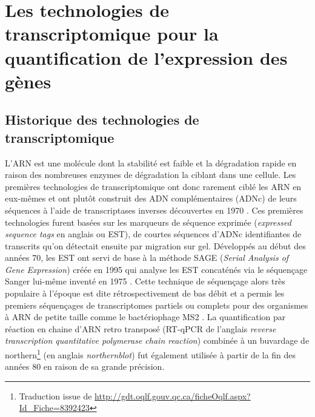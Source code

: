 \section{Les technologies de transcriptomique pour la quantification de l'expression des gènes}

\subsection{Historique des technologies de transcriptomique}

L'ARN est une molécule dont la stabilité est faible et la dégradation rapide en raison des nombreuses enzymes de dégradation la ciblant dans une cellule. Les premières technologies de transcriptomique ont donc rarement ciblé les ARN en eux-mêmes et ont plutôt construit des ADN complémentaires (ADNc) de leurs séquences à l'aide de transcriptases inverses découvertes en 1970 \cite{Temin1970Jun}. Ces premières technologies furent basées sur les marqueurs de séquence exprimée (\textit{expressed sequence tags} en anglais ou EST), de courtes séquences d'ADNc identifiantes de transcrits qu'on détectait ensuite par migration sur gel. Développés au début des années 70, les EST ont servi de base à la méthode SAGE (\textit{Serial Analysis of Gene Expression}) créée en 1995 \cite{Velculescu1995Oct} qui analyse les EST concaténés via le séquençage Sanger lui-même inventé en 1975 \cite{Sanger1975May}. Cette technique de séquençage alors très populaire à l'époque \cite{Marra1998Jan} est dite rétrospectivement de bas débit et a permis les premiers séquençages de transcriptomes partiels \cite{Jeppesen1970Apr} ou complets pour des organismes à ARN de petite taille comme le bactériophage MS2 \cite{Fiers1976Apr}. La quantification par réaction en chaine d'ARN retro transposé (RT-qPCR de l'anglais \textit{reverse transcription quantitative polymerase chain reaction}) combinée à un buvardage de northern\footnote{Traduction issue de \url{http://gdt.oqlf.gouv.qc.ca/ficheOqlf.aspx?Id_Fiche=8392423}} (en anglais \textit{northernblot}) fut également utilisée à partir de la fin des années 80 en raison de sa grande précision\cite{Becker-Andre1989Nov}.

